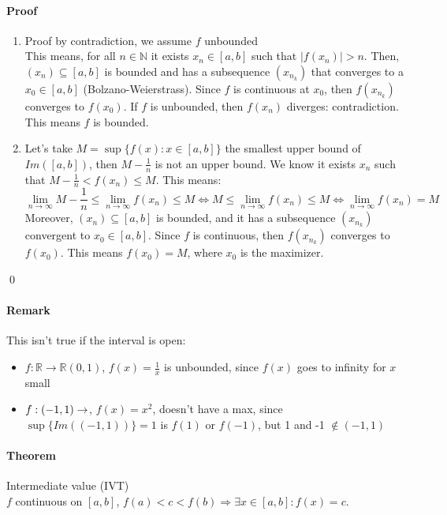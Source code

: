 \documentclass{article}
\newcommand{\abs}[1]{\left|#1\right|}
\newcommand{\func}[3]{#1 : #2 \rightarrow #3}
\newcommand{\funcR}[1]{#1 : \mathbb{R} \rightarrow \mathbb{R}}
\newcommand{\limn}{\lim_{n \to \infty}}
\newcommand{\intcc}[1]{\left[#1\right]}
\newcommand{\intoo}[1]{\left(#1\right)}
\newcommand{\N}{\mathbb{N}}
\newcommand{\Theorem}{\paragraph{Theorem}}
\newcommand{\Remark}{\paragraph{Remark}}
\newcommand{\Proof}{\paragraph{Proof}}
\begin{document}
  \Proof
  \begin{enumerate}[label=(\roman*)]
    \item Proof by contradiction, we assume $f$ unbounded
  \\This means, for all $n \in \N$ it exists $x_n \in \intcc{a,b}$ such that
    $\abs{f(x_n)} > n$. Then, $(x_n) \subseteq \intcc{a,b}$ is bounded and has
    a subsequence $(x_{n_k})$ that converges to a $x_0 \in \intcc{a,b}$
    (Bolzano-Weierstrass). Since $f$ is continuous at $x_0$, then $f(x_{n_k})$
    converges to $f(x_0)$. If $f$ is unbounded, then $f(x_n)$ diverges:
    contradiction. This means $f$ is bounded.

    \item Let's take $M = \sup\{ f(x) : x \in \intcc{a,b} \}$ the smallest upper
    bound of $Im(\intcc{a,b})$, then $M - \frac{1}{n}$ is not an upper bound.
    We know it exists $x_n$ such that $M - \frac{1}{n} < f(x_n) \leq M$. This
    means:
    \begin{equation*}
      \limn{M - \frac{1}{n}} \leq \limn{f(x_n)} \leq M \iff
      M \leq \limn{f(x_n)} \leq M \iff \limn{f(x_n)} = M
    \end{equation*}
    Moreover, $(x_n) \subseteq \intcc{a,b}$ is bounded, and it has a subsequence
    $(x_{n_k})$ convergent to $x_0 \in \intcc{a,b}$. Since $f$ is continuous,
    then $f(x_{n_k})$ converges to $f(x_0)$. This means $f(x_0) = M$, where
    $x_0$ is the maximizer.
  \end{enumerate}
  \qed

  \Remark This isn't true if the interval is open:
  \begin{itemize}
    \item $\funcR{f}{\intoo{0,1}}$, $f(x) = \frac{1}{x}$ is unbounded, since
    $f(x)$ goes to infinity for $x$ small

    \item $\func{f}{\intoo{-1,1}}$, $f(x) = x^2$, doesn't have a max, since
    $\sup\{ Im(\intoo{-1,1}) \} = 1$ is $f(1)$ or $f(-1)$, but 1 and -1 $\notin
    \intoo{-1,1}$
  \end{itemize}

  \Theorem Intermediate value (IVT)
\\$f$ continuous on $\intcc{a,b}$, $f(a) < c < f(b) \Rightarrow \exists x \in
  \intcc{a,b} : f(x) = c$.
\end{document}
